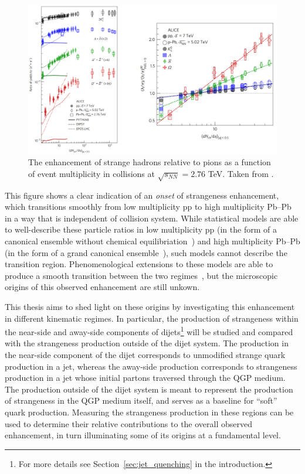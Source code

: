 \begin{figure}
\centering
\includegraphics[width=\textwidth]{figures/introduction/strangeness_enhancement.png}
\caption{The enhancement of strange hadrons relative to pions as a function of event multiplicity in \PbPb collisions at $\sqrt{s_{NN}} = 2.76$ TeV. Taken from \cite{ALICE:2017jyt}.}
\label{fig:ref_enhancement}
\end{figure}

This figure shows a clear indication of an \textit{onset} of strangeness enhancement, which transitions smoothly from low multiplicity pp to high multiplicity Pb--Pb in a way that is independent of collision system. While statistical models are able to well-describe these particle ratios in low multiplicity pp (in the form of a canonical ensemble without chemical equilibriation~\cite{NATURE15, NATURE16}) and high multiplicity Pb--Pb (in the form of a grand canonical ensemble~\cite{NATURE16}), such models cannot describe the transition region. Phenomenological extensions to these models are able to produce a smooth transition between the two regimes~\cite{NATURE18, NATURE19}, but the microscopic origins of this observed enhancement are still unkown. 

This thesis aims to shed light on these origins by investigating this enhancement in different kinematic regimes. In particular, the production of strangeness within the near-side and away-side components of dijets\footnote{For more details see Section~\ref{sec:jet_quenching} in the introduction.} will be studied and compared with the strangeness production outside of the dijet system. The production in the near-side component of the dijet corresponds to unmodified strange quark production in a jet, whereas the away-side production corresponds to strangeness production in a jet whose initial partons traversed through the QGP medium. The production outside of the dijet system is meant to represent the production of strangeness in the QGP medium itself, and serves as a baseline for ``soft'' quark production. Measuring the strangeness production in these regions can be used to determine their relative contributions to the overall observed enhancement, in turn illuminating some of its origins at a fundamental level.

